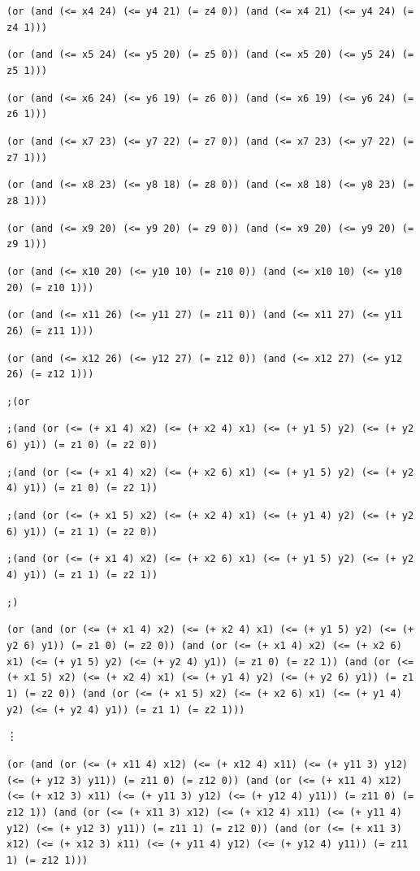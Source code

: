 \documentclass[12pt]{article}
\begin{document}
{{\tt (or (and (<= x4 24) (<= y4 21) (= z4 0)) (and (<= x4 21) (<= y4 24) (= z4 1))) }

{\tt (or (and (<= x5 24) (<= y5 20) (= z5 0)) (and (<= x5 20) (<= y5 24) (= z5 1))) }

{\tt (or (and (<= x6 24) (<= y6 19) (= z6 0)) (and (<= x6 19) (<= y6 24) (= z6 1))) }

{\tt (or (and (<= x7 23) (<= y7 22) (= z7 0)) (and (<= x7 23) (<= y7 22) (= z7 1))) }

{\tt (or (and (<= x8 23) (<= y8 18) (= z8 0)) (and (<= x8 18) (<= y8 23) (= z8 1))) }

{\tt (or (and (<= x9 20) (<= y9 20) (= z9 0)) (and (<= x9 20) (<= y9 20) (= z9 1))) }

{\tt (or (and (<= x10 20) (<= y10 10) (= z10 0)) (and (<= x10 10) (<= y10 20) (= z10 1))) }

{\tt (or (and (<= x11 26) (<= y11 27) (= z11 0)) (and (<= x11 27) (<= y11 26) (= z11 1))) }

{\tt (or (and (<= x12 26) (<= y12 27) (= z12 0)) (and (<= x12 27) (<= y12 26) (= z12 1))) }

{\tt ;(or }

{\tt ;(and (or (<= (+ x1 4) x2) (<= (+ x2 4) x1) (<= (+ y1 5) y2) (<= (+ y2 6) y1)) (= z1 0) (= z2 0)) }

{\tt ;(and (or (<= (+ x1 4) x2) (<= (+ x2 6) x1) (<= (+ y1 5) y2) (<= (+ y2 4) y1)) (= z1 0) (= z2 1)) }

{\tt ;(and (or (<= (+ x1 5) x2) (<= (+ x2 4) x1) (<= (+ y1 4) y2) (<= (+ y2 6) y1)) (= z1 1) (= z2 0)) }

{\tt ;(and (or (<= (+ x1 4) x2) (<= (+ x2 6) x1) (<= (+ y1 5) y2) (<= (+ y2 4) y1)) (= z1 1) (= z2 1)) }

{\tt ;) }

{\tt (or (and (or (<= (+ x1 4) x2) (<= (+ x2 4) x1) (<= (+ y1 5) y2) (<= (+ y2 6) y1)) (= z1 0) (= z2 0)) (and (or (<= (+ x1 4) x2) (<= (+ x2 6) x1) (<= (+ y1 5) y2) (<= (+ y2 4) y1)) (= z1 0) (= z2 1)) (and (or (<= (+ x1 5) x2) (<= (+ x2 4) x1) (<= (+ y1 4) y2) (<= (+ y2 6) y1)) (= z1 1) (= z2 0)) (and (or (<= (+ x1 5) x2) (<= (+ x2 6) x1) (<= (+ y1 4) y2) (<= (+ y2 4) y1)) (= z1 1) (= z2 1))) }

\vdots

{\tt (or (and (or (<= (+ x11 4) x12) (<= (+ x12 4) x11) (<= (+ y11 3) y12) (<= (+ y12 3) y11)) (= z11 0) (= z12 0)) (and (or (<= (+ x11 4) x12) (<= (+ x12 3) x11) (<= (+ y11 3) y12) (<= (+ y12 4) y11)) (= z11 0) (= z12 1)) (and (or (<= (+ x11 3) x12) (<= (+ x12 4) x11) (<= (+ y11 4) y12) (<= (+ y12 3) y11)) (= z11 1) (= z12 0)) (and (or (<= (+ x11 3) x12) (<= (+ x12 3) x11) (<= (+ y11 4) y12) (<= (+ y12 4) y11)) (= z11 1) (= z12 1))) }

}
\end{document}
